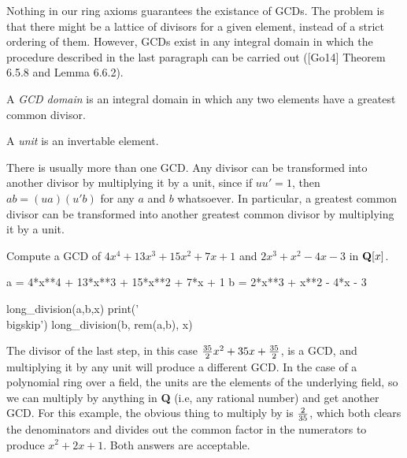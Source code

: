 Nothing in our ring axioms guarantees the existance of GCDs.  The
problem is that there might be a lattice of divisors for a given
element, instead of a strict ordering of them.  However, GCDs exist in
any integral domain in which the procedure described in the last
paragraph can be carried out ([Go14] Theorem 6.5.8 and Lemma 6.6.2).

\begin{key point}
A {\it GCD domain} is an integral domain in which
any two elements have a greatest common divisor.
\end{key point}

\begin{key point}
A {\it unit} is an invertable element.
\end{key point}

There is usually more than one GCD.  Any divisor can be transformed into
another divisor by multiplying it by a unit, since if $uu'=1$, then
$ab=(ua)(u'b)$ for any $a$ and $b$ whatsoever.  In particular, a
greatest common divisor can be transformed into another greatest
common divisor by multiplying it by a unit.

\begin{comment}
I leave without proof the
claims that in ${\cal F}[x]$, the units are all elements in ${\cal
F}$, and that all GCDs differ from each other by a unit multiple.
\end{comment}

\vfill\eject

\example

Compute a GCD of $4x^4+13x^3+15x^2+7x+1$ and $2x^3+x^2-4x-3$ in ${\bf Q}[x]$.

\bigskip

\begin{sympycode}
a = 4*x**4 + 13*x**3 + 15*x**2 + 7*x + 1
b = 2*x**3 + x**2 - 4*x - 3

long_division(a,b,x)
print('\\bigskip')
long_division(b, rem(a,b), x)
\end{sympycode}

\bigskip

The divisor of the last step, in this case
${35\over2}x^2+35x+{35\over2}$, is a GCD, and multiplying it by any unit
will produce a different GCD.  In the case of a polynomial ring over a
field, the units are the elements of the underlying field, so we can
multiply by anything in {\bf Q} (i.e, any rational number) and get
another GCD.  For this example, the obvious thing to multiply by is
$2\over35$, which both clears the denominators and divides out the
common factor in the numerators to produce $x^2+2x+1$.  Both answers
are acceptable.

